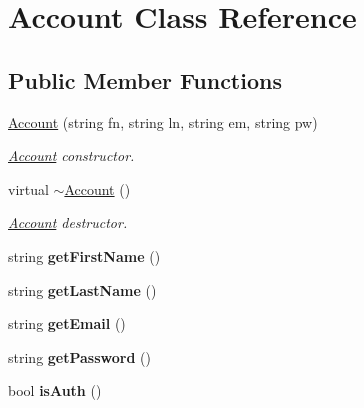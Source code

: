 \hypertarget{classAccount}{}\section{Account Class Reference}
\label{classAccount}
\subsection*{Public Member Functions}
\begin{DoxyCompactItemize}
\item 
\hyperlink{classAccount_aea61ea2175658b5cb42f9098a1824091}{Account} (string fn, string ln, string em, string pw)
\begin{DoxyCompactList}\small\item\em \hyperlink{classAccount}{Account} constructor. \end{DoxyCompactList}\item 
virtual \hyperlink{classAccount_a569c9ef0e42b9157690b4ceb646daba8}{$\sim$\+Account} ()\hypertarget{classAccount_a569c9ef0e42b9157690b4ceb646daba8}{}\label{classAccount_a569c9ef0e42b9157690b4ceb646daba8}

\begin{DoxyCompactList}\small\item\em \hyperlink{classAccount}{Account} destructor. \end{DoxyCompactList}\item 
string {\bfseries get\+First\+Name} ()\hypertarget{classAccount_aea5b18f537c4ab3318f807d28608d769}{}\label{classAccount_aea5b18f537c4ab3318f807d28608d769}

\item 
string {\bfseries get\+Last\+Name} ()\hypertarget{classAccount_aefcb8adf5b6eb493a6d9984868ea4989}{}\label{classAccount_aefcb8adf5b6eb493a6d9984868ea4989}

\item 
string {\bfseries get\+Email} ()\hypertarget{classAccount_a76267f15ded99bc30a768df20c7a7470}{}\label{classAccount_a76267f15ded99bc30a768df20c7a7470}

\item 
string {\bfseries get\+Password} ()\hypertarget{classAccount_a4ceee3a414012198fa0f9c9c6e2b9c7c}{}\label{classAccount_a4ceee3a414012198fa0f9c9c6e2b9c7c}

\item 
bool {\bfseries is\+Auth} ()\hypertarget{classAccount_a220de6a3d6eb5b5906713bfb61ae4f85}{}\label{classAccount_a220de6a3d6eb5b5906713bfb61ae4f85}


\end{DoxyCompactItemize}
